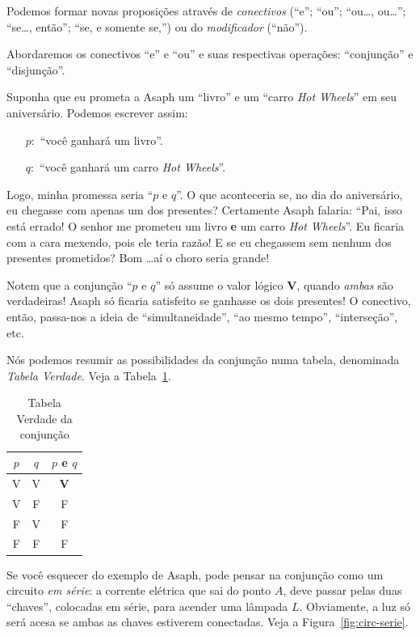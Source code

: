 \documentclass[12pt]{article}
\theoremstyle{definition}
\newcommand{\V}{\textbf{V}}
\begin{document}
Podemos formar novas proposições através de \textit{conectivos} (``e''; ``ou'';
``ou\ldots, ou\ldots''; ``se\ldots, então''; ``se, e somente se,'') ou do
\textit{modificador} (``não'').

Abordaremos os conectivos ``e'' e ``ou'' e suas respectivas operações: 
``conjunção'' e ``disjunção''.

Suponha que eu prometa a Asaph um ``livro'' e um ``carro \textit{Hot Wheels}''
em seu aniversário.
Podemos escrever assim:
\begin{enumerate}
\item[$p:$] ``você ganhará um livro''.
\item[$q:$] ``você ganhará um carro \textit{Hot Wheels}''.
\end{enumerate} 

Logo, minha promessa seria ``$p \text{ e } q$''.
O que aconteceria se, no dia do aniversário, eu chegasse com apenas um dos 
presentes?
Certamente Asaph falaria: ``Pai, isso está errado! O senhor me prometeu um 
livro \textbf{e} um carro \textit{Hot Wheels}''.
Eu ficaria com a cara mexendo, pois ele teria razão!
E se eu chegassem sem nenhum dos presentes prometidos?
Bom \ldots aí o choro seria grande!

Notem que a conjunção ``$p \text{ e } q$'' só assume o valor lógico \textbf{V},
quando \textit{ambas} são verdadeiras!
Asaph só ficaria satisfeito se ganhasse os dois presentes!
O conectivo, então, passa-nos a ideia de ``simultaneidade'', ``ao mesmo tempo'',
``interseção'', etc.

Nós podemos resumir as possibilidades da conjunção numa tabela, denominada
\textit{Tabela Verdade}. Veja a Tabela~\ref{tab:conjuncao}.

\begin{table}[!htbp]%
\centering
\scalebox{0.8}
 {
  \begin{tabular}{ccc}
	  \toprule
    $p$ & $q$ & $p$ e $q$\\
	  \midrule
    V   &  V  & \V\\
	  	V   &  F  & F\\
	  	F   &  V  & F\\
	  	F   &  F  & F\\
	  \bottomrule
  \end{tabular}
 }
\caption{Tabela Verdade da conjunção}
\label{tab:conjuncao}
\end{table}

Se você esquecer do exemplo de Asaph, pode pensar na conjunção como um circuito
\textit{em série}: a corrente elétrica que sai do ponto $A$, deve passar pelas
duas ``chaves'', colocadas em série, para acender uma lâmpada $L$. Obviamente, 
a luz só será acesa se ambas as chaves estiverem conectadas. Veja a 
Figura~\ref{fig:circ-serie}.
\end{document}

